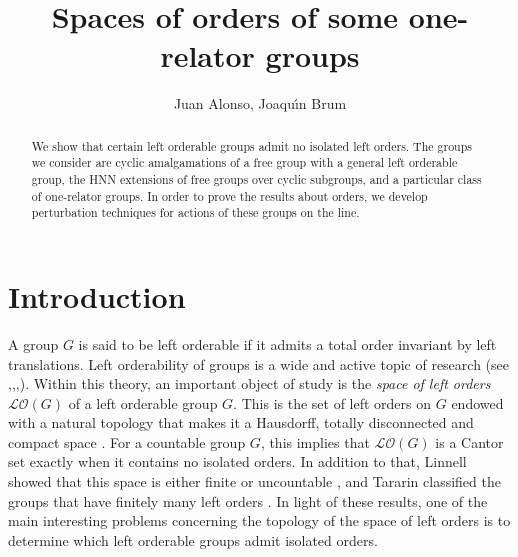 \documentclass[12pt]{article}
\date{}
\author{}
\theoremstyle{definition}
\begin{document}
\title{Spaces of orders of some one-relator groups}
\author{Juan Alonso, Joaqu\'\i n Brum}
\maketitle

\begin{abstract}
We show that certain left orderable groups admit no isolated left orders. The groups we consider are cyclic amalgamations of a free group with a general left orderable group, the HNN extensions of free groups over cyclic subgroups, and a particular class of one-relator groups. In order to prove the results about orders, we develop perturbation techniques for actions of these groups on the line.  
\end{abstract}



\section{Introduction}\label{intro}


A group $G$ is said to be left orderable if it admits a total order invariant by left translations. Left orderability of groups is a wide and active topic of research (see \cite{ghys},\cite{clay rolfsen},\cite{GOD},\cite{KM}). Within this theory, an important object of study is the {\em space of left orders} $\mathcal{LO}(G)$ of a left orderable group $G$. This is the set of left orders on $G$ endowed with a natural topology that makes it a Hausdorff, totally disconnected and compact space \cite{sikora}. For a countable group $G$, this implies that $\mathcal{LO}(G)$ is a Cantor set exactly when it contains no isolated orders. In addition to that, Linnell showed that this space is either finite or uncountable \cite{linnell}, and Tararin classified the groups that have finitely many left orders \cite[Theorem 5.2.1]{KM}. In light of these results, one of the main interesting problems concerning the topology of the space of left orders is to determine which left orderable groups admit isolated orders. 
\end{document}
